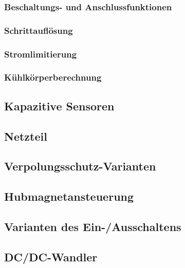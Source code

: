 \subsubsection{Beschaltungs- und Anschlussfunktionen}
\subsubsection{Schrittauflösung}
\subsubsection{Stromlimitierung}
\subsubsection{Kühlkörperberechnung}

\subsection{Kapazitive Sensoren}

\subsection{Netzteil}

\subsection{Verpolungsschutz-Varianten}

\subsection{Hubmagnetansteuerung}

\subsection{Varianten des Ein-/Ausschaltens}

\subsection{DC/DC-Wandler}




